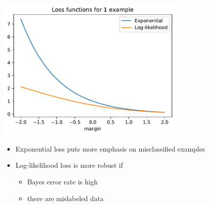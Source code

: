 \documentclass[handout]{beamer}
\begin{document}
\begin{frame}
\centering
\includegraphics[width=0.7\textwidth]{figs/exp_ll_losses}
\begin{itemize}[<+>]
	\item Exponential loss puts more emphasis on misclassified examples
	\item Log-likelihood loss is more robust if
	\begin{itemize}[<.>]
		\item Bayes error rate is high
		\item there are mislabeled data
	\end{itemize}
\end{itemize}
\end{frame}
\end{document}
